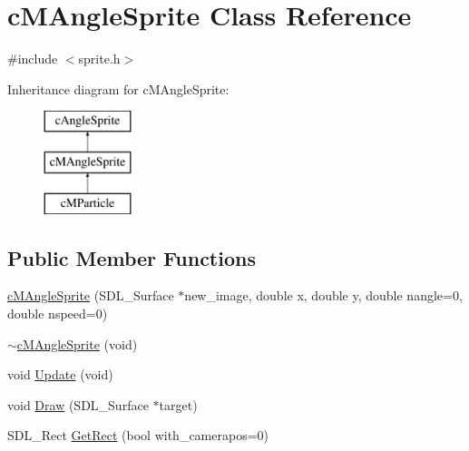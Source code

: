 \hypertarget{classc_m_angle_sprite}{\section{c\-M\-Angle\-Sprite Class Reference}
\label{classc_m_angle_sprite}
}


{\ttfamily \#include $<$sprite.\-h$>$}

Inheritance diagram for c\-M\-Angle\-Sprite\-:\begin{figure}[H]
\begin{center}
\leavevmode
\includegraphics[height=3.000000cm]{classc_m_angle_sprite}
\end{center}
\end{figure}
\subsection*{Public Member Functions}
\begin{DoxyCompactItemize}
\item 
\hyperlink{classc_m_angle_sprite_abe168ace1cc60f06914ef8cf5879aaf2}{c\-M\-Angle\-Sprite} (S\-D\-L\-\_\-\-Surface $\ast$new\-\_\-image, double x, double y, double nangle=0, double nspeed=0)
\item 
\hyperlink{classc_m_angle_sprite_a10555be043595294d0cd31dda412a1dc}{$\sim$c\-M\-Angle\-Sprite} (void)
\item 
void \hyperlink{classc_m_angle_sprite_a42facb500fb312966e8babe1e9f00956}{Update} (void)
\item 
void \hyperlink{classc_m_angle_sprite_a8f2392017072fe99b8abec0230eadfc5}{Draw} (S\-D\-L\-\_\-\-Surface $\ast$target)
\item 
S\-D\-L\-\_\-\-Rect \hyperlink{classc_m_angle_sprite_a0a510f4a1d7eee1765c4659381d95f09}{Get\-Rect} (bool with\-\_\-camerapos=0)
\end{DoxyCompactItemize}
